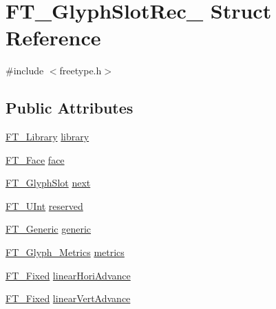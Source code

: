 \hypertarget{struct_f_t___glyph_slot_rec__}{}\section{F\+T\+\_\+\+Glyph\+Slot\+Rec\+\_\+ Struct Reference}
\label{struct_f_t___glyph_slot_rec__}


{\ttfamily \#include $<$freetype.\+h$>$}

\subsection*{Public Attributes}
\begin{DoxyCompactItemize}
\item 
\mbox{\hyperlink{freetype_8h_a92857f8bf079b7b9ef5d3ce74cf89ef5}{F\+T\+\_\+\+Library}} \mbox{\hyperlink{struct_f_t___glyph_slot_rec___a5415bcbf70efb3aae7a6b77040e21e91}{library}}
\item 
\mbox{\hyperlink{freetype_8h_a7eba045ee20968354fa1bff0f69740fa}{F\+T\+\_\+\+Face}} \mbox{\hyperlink{struct_f_t___glyph_slot_rec___a0f5dbaf7d539bf2d92ecdff740342b04}{face}}
\item 
\mbox{\hyperlink{freetype_8h_a768daa0d9c3fa499e6c37034ee9f2ca3}{F\+T\+\_\+\+Glyph\+Slot}} \mbox{\hyperlink{struct_f_t___glyph_slot_rec___af339309df5ebe70dfa62a9f4f8838440}{next}}
\item 
\mbox{\hyperlink{fttypes_8h_abcb8db4dbf35d2b55a9e8c7b0926dc52}{F\+T\+\_\+\+U\+Int}} \mbox{\hyperlink{struct_f_t___glyph_slot_rec___ae829996584939557dfe46c4e4f2b28a8}{reserved}}
\item 
\mbox{\hyperlink{fttypes_8h_ae15e8550dd7d863328686aadaead5c77}{F\+T\+\_\+\+Generic}} \mbox{\hyperlink{struct_f_t___glyph_slot_rec___ac2d04848997fba660e17bc00760ef14f}{generic}}
\item 
\mbox{\hyperlink{freetype_8h_aba844698c24c1c12727c60a6fc0a9b3d}{F\+T\+\_\+\+Glyph\+\_\+\+Metrics}} \mbox{\hyperlink{struct_f_t___glyph_slot_rec___abe1ba307281c06a232f50e34c061ce7b}{metrics}}
\item 
\mbox{\hyperlink{fttypes_8h_a5f5a679cc09f758efdd0d1c5feed3c3d}{F\+T\+\_\+\+Fixed}} \mbox{\hyperlink{struct_f_t___glyph_slot_rec___a9d0ba6b09729d4f009ef380e267607c3}{linear\+Hori\+Advance}}
\item 
\mbox{\hyperlink{fttypes_8h_a5f5a679cc09f758efdd0d1c5feed3c3d}{F\+T\+\_\+\+Fixed}} \mbox{\hyperlink{struct_f_t___glyph_slot_rec___abc10f58c3d859e46694515956aa4a1e8}{linear\+Vert\+Advance}}
\item 

\end{DoxyCompactItemize}
